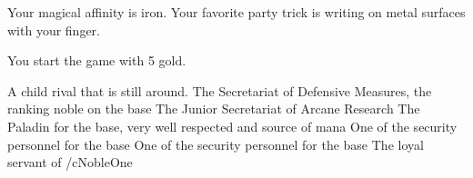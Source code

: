 \documentclass[char]{guildcamp3}
\begin{document}
\begin{itemz}[Notes]
	\item Your magical affinity is iron. Your favorite party trick is writing on metal surfaces with your finger.
	\item You start the game with 5 gold. 
\end{itemz}

\begin{contacts}
  \contact{\cMageTwo{}} A child rival that is still around.
  \contact{\cNobleOne{}} The Secretariat of Defensive Measures, the ranking noble on the base
  \contact{\cNobleTwo{}} The Junior Secretariat of Arcane Research
  \contact{\cPaladin{}} The Paladin for the base, very well respected and source of mana 
  \contact{\cRogueOne{}} One of the security personnel for the base
  \contact{\cRogueTwo{}} One of the security personnel for the base
  \contact{\cServant{}} The loyal servant of /cNobleOne{} 
\end{contacts}
\end{document}
